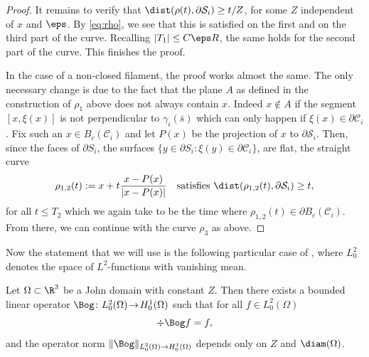 \begin{proof}
It remains to verify that $ \dist(\rho(t),\partial \mathcal S_i) \geq t/Z$, for some $Z$ independent of $x$ and $\eps$.
By \eqref{eq:rho}, we see that this is satisfied on the first and on the third part of the curve. Recalling $|T_1| \leq C \eps R$, the same holds for the second part of the curve. This finishes the proof.

In the case of a non-closed filament, the proof works almost the same. The only necessary change is due to the fact that the plane $A$ as defined in the construction of $\rho_1$ above does not always contain $x$. Indeed $x \not \in A$ if the segment $[x,\xi(x)]$ is not perpendicular to $\gamma_i (\bar s)$ which can only happen if $\xi (x) \in \partial \mathcal C_i$. Fix such an $x \in B_c(\mathcal C_i)$ and let $P(x)$ be the projection of $x$ to $\partial \mathcal S_i$. Then, since the faces of $\partial S_i$, \ie the surfaces $\{y \in \partial S_i : \xi(y) \in \partial \mathcal C_i\}$, are flat, the straight curve
\begin{equation}
\rho_{1,2}(t):= x + t \frac{x - P(x)}{|x - P(x)|}
\quad\text{satisfies }
\dist(\rho_{1,2}(t), \partial \mathcal S_i) \geq t,
\end{equation}
for all $t \leq T_2$ which we again take to be the time where $\rho_{1,2}(t) \in \partial B_c(\mathcal C_i)$. From there, we can continue with the curve $\rho_3$ as above.
\end{proof}

Now the statement that we will use is the following particular case of {\cite[Th.\,4.1]{AcostaDuranMuschietti06}}, where
$L^2_0$ denotes the space of $L^2$-functions with vanishing mean.
\begin{thm} \label{John}
Let $\Omega \subset \R^3$ be a John domain with constant $Z$. Then there exists a bounded linear operator
$\Bog \colon L^2_0(\Omega)\!\to\!H^{1}_0(\Omega)$
such that for all \hbox{$f \!\in\!L^2_0(\Omega)$}%
\begin{equation}
\div \Bog f = f,
\end{equation}
and the operator norm
$\|\Bog\|_{L^2_0(\Omega) \to H^{1}_0(\Omega)}$ depends only on $Z$ and $\diam(\Omega)$.
\end{thm}

